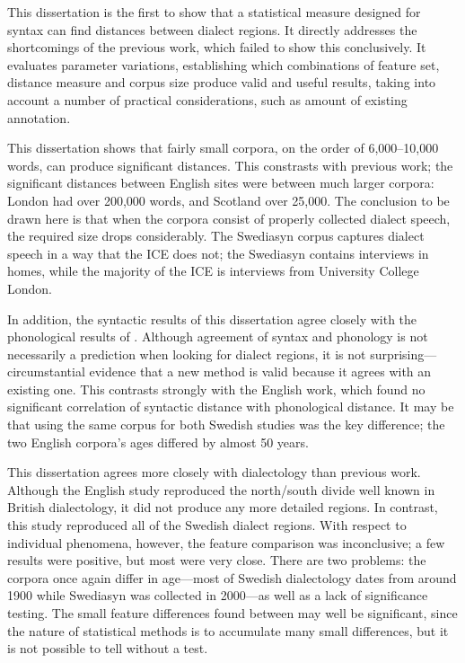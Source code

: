 This dissertation is the first to show that a statistical measure
designed for syntax can find distances between dialect regions. It
directly addresses the shortcomings of the previous work, which failed
to show this conclusively. It evaluates parameter variations,
establishing which combinations of feature set, distance measure and
corpus size produce valid and useful results, taking into account a
number of practical considerations, such as amount of existing
annotation.

This dissertation shows that fairly small corpora, on the order of
6,000--10,000 words, can produce significant distances. This
constrasts with previous work; the significant distances between
English sites were between much larger corpora: London had over
200,000 words, and Scotland over 25,000. The conclusion to be drawn
here is that when the corpora consist of properly collected dialect
speech, the required size drops considerably. The Swediasyn corpus
captures dialect speech in a way that the ICE does not; the Swediasyn
contains interviews in homes, while the majority of the ICE is
interviews from University College London.

In addition, the syntactic results of this dissertation agree closely
with the phonological results of . Although
agreement of syntax and phonology is not necessarily a prediction when
looking for dialect regions, it is not surprising---circumstantial
evidence that a new method is valid because it agrees with an existing
one. This contrasts strongly with the English work, which found no
significant correlation of syntactic distance with phonological
distance. It may be that using the same corpus for both Swedish
studies was the key difference; the two English corpora's ages differed by
almost 50 years.

This dissertation agrees more closely with dialectology than previous
work. Although the English study reproduced the north/south divide
well known in British dialectology, it did not produce any more
detailed regions. In contrast, this study reproduced all of the
Swedish dialect regions. With respect to individual phenomena,
however, the feature comparison was inconclusive; a few results were
positive, but most were very close. There are two problems: the
corpora once again differ in age---most of Swedish dialectology dates
from around 1900 while Swediasyn was collected in 2000---as well as a
lack of significance testing. The small feature differences found
between may well be significant, since the nature of statistical
methods is to accumulate many small differences, but it is not
possible to tell without a test.

